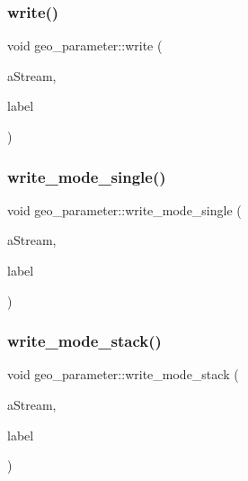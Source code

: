 \mbox{\label{classgeo__parameter_a685714e059a2a6e9b44992c9ad7912cc}} 
\subsubsection{\texorpdfstring{write()}{write()}}
{\footnotesize\ttfamily void geo\+\_\+parameter\+::write (\begin{DoxyParamCaption}\item[{ofstream \&}]{a\+Stream,  }\item[{\mbox{\hyperlink{galois_8h_ab6cc7b4aeb6ea31aba2b3fbfc83ff5e6}{B\+Y\+TE}} $\ast$}]{label }\end{DoxyParamCaption})}

\mbox{\label{classgeo__parameter_a5097d773e635d3c7fe6a7aaf06cf87d4}} 
\subsubsection{\texorpdfstring{write\+\_\+mode\+\_\+single()}{write\_mode\_single()}}
{\footnotesize\ttfamily void geo\+\_\+parameter\+::write\+\_\+mode\+\_\+single (\begin{DoxyParamCaption}\item[{ofstream \&}]{a\+Stream,  }\item[{\mbox{\hyperlink{galois_8h_ab6cc7b4aeb6ea31aba2b3fbfc83ff5e6}{B\+Y\+TE}} $\ast$}]{label }\end{DoxyParamCaption})}

\mbox{\label{classgeo__parameter_a38d2ab99d749dbdbf6c92e732bc41f05}} 
\subsubsection{\texorpdfstring{write\+\_\+mode\+\_\+stack()}{write\_mode\_stack()}}
{\footnotesize\ttfamily void geo\+\_\+parameter\+::write\+\_\+mode\+\_\+stack (\begin{DoxyParamCaption}\item[{ofstream \&}]{a\+Stream,  }\item[{\mbox{\hyperlink{galois_8h_ab6cc7b4aeb6ea31aba2b3fbfc83ff5e6}{B\+Y\+TE}} $\ast$}]{label }\end{DoxyParamCaption})}



